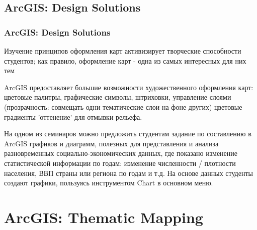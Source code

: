 \documentclass[pdflatex,compress,8pt,
	xcolor={dvipsnames,dvipsnames,svgnames,x11names,table},
	hyperref={	 
	pdfauthor={Lemenkova Polina}, 
	pdfsubject={Preentation}, 
	pdfcreator={Lemenkova Polina}, 
	pdfproducer={Lemenkova Polina}, 
	colorlinks=true,
	linkcolor=Red3, 
	citecolor=NavyBlue, 
	urlcolor = NavyBlue, 
	breaklinks = true}]{beamer}
\begin{document}
\subsection{ArcGIS: Design Solutions}
\begin{frame}\frametitle{ArcGIS: Design Solutions}
\small{
\begin{alertblock}{}
Изучение принципов оформления карт активизирует творческие способности студентов; как правило, оформление карт - одна из самых интересных для них тем
\end{alertblock}

\begin{block}{}
ArcGIS предоставляет большие возможности художественного оформления карт: цветовые палитры,  графические символы, штриховки, управление слоями (прозрачность: совмещать одни тематические слои на фоне других) цветовые градиенты 'оттенение' для отмывки рельефа.
\end{block}
}
\begin{figure}[H]
	\centering
			\hspace{1mm}
\end{figure}
\small{
\begin{alertblock}{}
На одном из семинаров можно предложить студентам задание по составлению в ArcGIS графиков и диаграмм, полезных для представления и анализа разновременных социально-экономических данных, где показано изменение статистической информации по годам: изменение численности / плотности населения, ВВП страны или региона по годам и т.д. На основе данных студенты создают графики, пользуясь инструментом Chart в основном меню.
\end{alertblock}
}
\end{frame}

\section{ArcGIS: Thematic Mapping}
\end{document}
